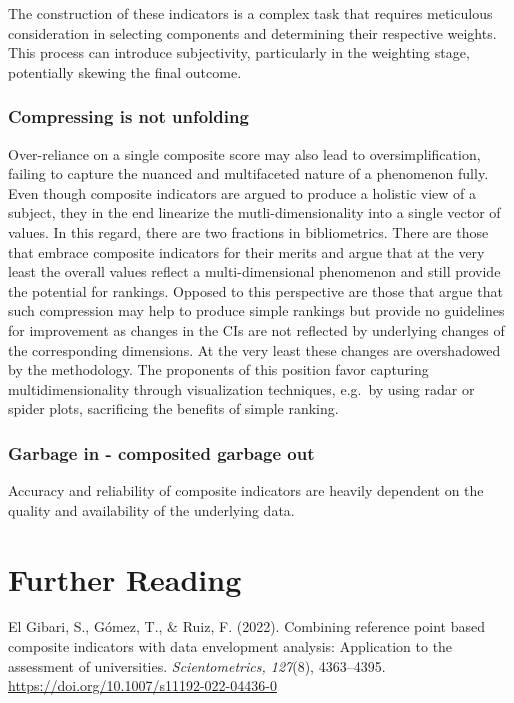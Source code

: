 \documentclass[
  letterpaper,
]{scrreprt}
\begin{document}
The construction of these indicators is a complex task that requires
meticulous consideration in selecting components and determining their
respective weights. This process can introduce subjectivity,
particularly in the weighting stage, potentially skewing the final
outcome.

\subsubsection{Compressing is not
unfolding}\label{compressing-is-not-unfolding}

Over-reliance on a single composite score may also lead to
oversimplification, failing to capture the nuanced and multifaceted
nature of a phenomenon fully. Even though composite indicators are
argued to produce a holistic view of a subject, they in the end
linearize the mutli-dimensionality into a single vector of values. In
this regard, there are two fractions in bibliometrics. There are those
that embrace composite indicators for their merits and argue that at the
very least the overall values reflect a multi-dimensional phenomenon and
still provide the potential for rankings. Opposed to this perspective
are those that argue that such compression may help to produce simple
rankings but provide no guidelines for improvement as changes in the CIs
are not reflected by underlying changes of the corresponding dimensions.
At the very least these changes are overshadowed by the methodology. The
proponents of this position favor capturing multidimensionality through
visualization techniques, e.g.~by using radar or spider plots,
sacrificing the benefits of simple ranking.

\subsubsection{Garbage in - composited garbage
out}\label{garbage-in---composited-garbage-out}

Accuracy and reliability of composite indicators are heavily dependent
on the quality and availability of the underlying data.

\section{Further Reading}\label{further-reading-5}

El Gibari, S., Gómez, T., \& Ruiz, F. (2022). Combining reference point
based composite indicators with data envelopment analysis: Application
to the assessment of universities. \emph{Scientometrics, 127}(8),
4363--4395. \url{https://doi.org/10.1007/s11192-022-04436-0}
\end{document}
